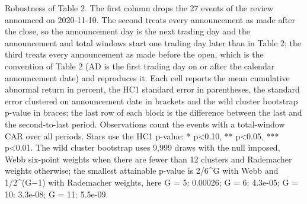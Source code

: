 \begin{threeparttable}
\begin{minipage}{\linewidth}
Robustness of Table 2. The first column drops the 27 events of the review announced on 2020-11-10. The second treats every announcement as made after the close, so the announcement day is the next trading day and the announcement and total windows start one trading day later than in Table 2; the third treats every announcement as made before the open, which is the convention of Table 2 (AD is the first trading day on or after the calendar announcement date) and reproduces it. Each cell reports the mean cumulative abnormal return in percent, the HC1 standard error in parentheses, the standard error clustered on announcement date in brackets and the wild cluster bootstrap p-value in braces; the last row of each block is the difference between the last and the second-to-last period. Observations count the events with a total-window CAR over all periods. Stars use the HC1 p-value: * p<0.10, ** p<0.05, *** p<0.01. The wild cluster bootstrap uses 9,999 draws with the null imposed, Webb six-point weights when there are fewer than 12 clusters and Rademacher weights otherwise; the smallest attainable p-value is 2/6\textasciicircum{}G with Webb and 1/2\textasciicircum{}(G$-$1) with Rademacher weights, here G = 5: 0.00026; G = 6: 4.3e-05; G = 10: 3.3e-08; G = 11: 5.5e-09.\end{minipage}

\end{threeparttable}